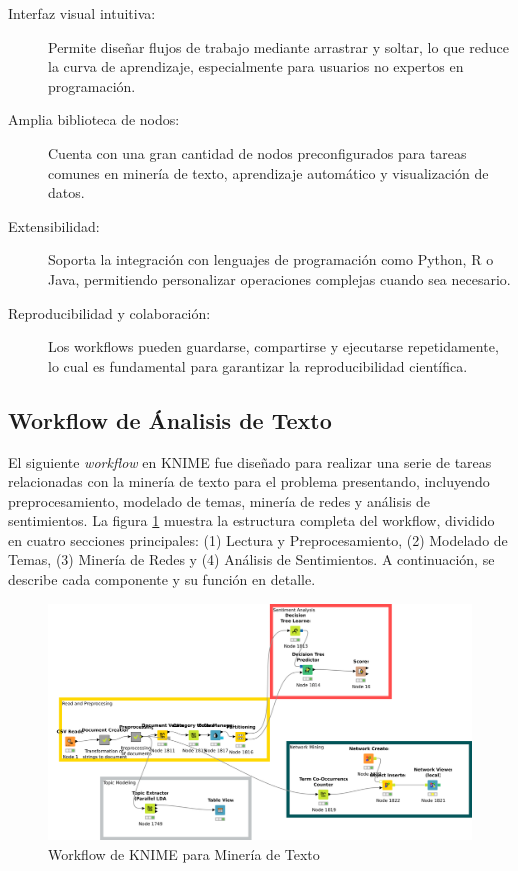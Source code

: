 \begin{description}
	\item[Interfaz visual intuitiva:] Permite diseñar flujos de trabajo mediante arrastrar y soltar, lo que reduce la curva de aprendizaje, especialmente para usuarios no expertos en programación.
	
	\item[Amplia biblioteca de nodos:] Cuenta con una gran cantidad de nodos preconfigurados para tareas comunes en minería de texto, aprendizaje automático y visualización de datos.
	
	\item[Extensibilidad:] Soporta la integración con lenguajes de programación como Python, R o Java, permitiendo personalizar operaciones complejas cuando sea necesario.
	
	\item[Reproducibilidad y colaboración:]  Los workflows pueden guardarse, compartirse y ejecutarse repetidamente, lo cual es fundamental para garantizar la reproducibilidad científica.
	
\end{description}


\subsection{Workflow de Ánalisis de Texto}

El siguiente \textit{workflow} en KNIME fue diseñado para realizar una serie de tareas relacionadas con la minería de texto para el problema presentando, incluyendo preprocesamiento, modelado de temas, minería de redes y análisis de sentimientos. La figura \ref{fig:knime_workflow} muestra la estructura completa del workflow, dividido en cuatro secciones principales: (1) Lectura y Preprocesamiento, (2) Modelado de Temas, (3) Minería de Redes y (4) Análisis de Sentimientos. A continuación, se describe cada componente y su función en detalle.

\begin{figure}[H]
	\centering
	\includegraphics[width=\textwidth, height=0.8\textheight, keepaspectratio]{src/full_workflow.png}
	\caption{Workflow de KNIME para Minería de Texto}
	\label{fig:knime_workflow}
\end{figure}

